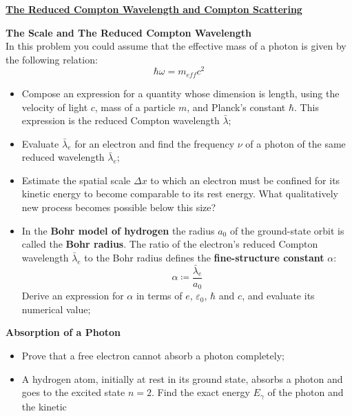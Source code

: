 \documentclass[a4paper]{article}
\begin{document}
	\Problem
	\textbf{\underline{The Reduced Compton Wavelength and Compton Scattering}}
	\begin{description}[leftmargin=!, labelwidth=\widthof{$\bullet$}]
		\item[$\bullet$] \textbf{The Scale and The Reduced Compton Wavelength}
		\\
		In this problem you could assume that the effective mass of a photon is given by the following relation:
		\begin{equation*}
			\boxed{\hbar \omega = m_{eff} c^2}
		\end{equation*}
		
		\begin{itemize}[leftmargin=0.5cm]
			\item[$\rightarrow$] Compose an expression for a quantity whose dimension is length, using the velocity of light $c$, mass of a particle $m$, and Planck's constant $\hbar$. This expression is the reduced Compton wavelength $\bar{\lambda}$;
			\item[$\rightarrow$] Evaluate $\bar{\lambda}_e$ for an electron and find the frequency $\nu$ of a photon of the same reduced wavelength $\bar{\lambda}_e$;
			\item[$\rightarrow$] Estimate the spatial scale $\Delta x$ to which an electron must be confined for its kinetic energy to become comparable to its rest energy. What qualitatively new process becomes possible below this size?
			\item[$\rightarrow$] In the \textbf{Bohr model of hydrogen} the radius $a_0$ of the ground-state orbit is called the
			\textbf{Bohr radius}. The ratio of the electron's
			reduced Compton wavelength $\bar{\lambda}_e$ to the
			Bohr radius defines the \textbf{fine-structure constant} $\alpha$:
			\begin{equation*}
				\boxed{\alpha \coloneq \frac{\bar{\lambda}_e}{a_0}}
			\end{equation*}
			Derive an expression for $\alpha$ in terms of $e$, $\varepsilon_0$,
			$\hbar$ and $c$, and evaluate its numerical value;
		\end{itemize}
		\item[$\bullet$] \textbf{Absorption of a Photon}
		\begin{itemize}[leftmargin=0.5cm]
			\item[$\rightarrow$] Prove that a free electron cannot absorb a photon completely;
			\item[$\rightarrow$] A hydrogen atom, initially at rest in its ground state, absorbs a photon and goes to the excited state $n=2$. Find the exact energy $E_{\gamma}$ of the photon and the kinetic

\end{itemize}
\end{description}
\end{document}
